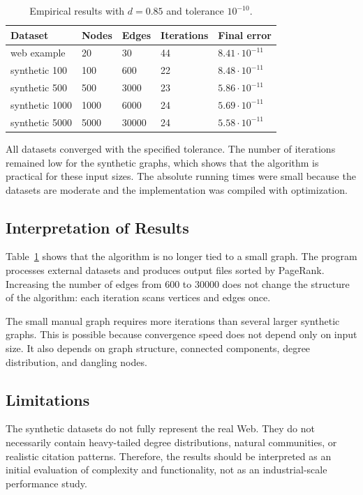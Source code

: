 \documentclass[runningheads]{llncs}
\begin{document}
\begin{table}
\caption{Empirical results with \(d=0.85\) and tolerance \(10^{-10}\).}\label{tab:empirical}
\begin{tabular}{|l|l|l|l|l|}
\hline
Dataset & Nodes & Edges & Iterations & Final error\\
\hline
web example & 20 & 30 & 44 & \(8.41\cdot 10^{-11}\)\\
synthetic 100 & 100 & 600 & 22 & \(8.48\cdot 10^{-11}\)\\
synthetic 500 & 500 & 3000 & 23 & \(5.86\cdot 10^{-11}\)\\
synthetic 1000 & 1000 & 6000 & 24 & \(5.69\cdot 10^{-11}\)\\
synthetic 5000 & 5000 & 30000 & 24 & \(5.58\cdot 10^{-11}\)\\
\hline
\end{tabular}
\end{table}

All datasets converged with the specified tolerance. The number of iterations remained low for the synthetic graphs, which shows that the algorithm is practical for these input sizes. The absolute running times were small because the datasets are moderate and the implementation was compiled with optimization.

\subsection{Interpretation of Results}

Table~\ref{tab:empirical} shows that the algorithm is no longer tied to a small graph. The program processes external datasets and produces output files sorted by PageRank. Increasing the number of edges from 600 to 30000 does not change the structure of the algorithm: each iteration scans vertices and edges once.

The small manual graph requires more iterations than several larger synthetic graphs. This is possible because convergence speed does not depend only on input size. It also depends on graph structure, connected components, degree distribution, and dangling nodes.

\subsection{Limitations}

The synthetic datasets do not fully represent the real Web. They do not necessarily contain heavy-tailed degree distributions, natural communities, or realistic citation patterns. Therefore, the results should be interpreted as an initial evaluation of complexity and functionality, not as an industrial-scale performance study.
\end{document}
